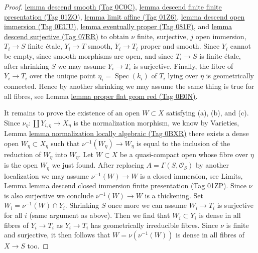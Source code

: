 \documentclass{amsart}
\theoremstyle{plain}
\theoremstyle{definition}
\theoremstyle{remark}
\numberwithin{equation}{subsection}
\def\Spec{\mathop{\mathrm{Spec}}}
\begin{document}
\begin{proof}
\href{https://stacks.math.columbia.edu/tag/0C0C}{lemma descend smooth (Tag 0C0C)},
\href{https://stacks.math.columbia.edu/tag/01ZO}{lemma descend finite finite presentation (Tag 01ZO)},
\href{https://stacks.math.columbia.edu/tag/01Z6}{lemma limit affine (Tag 01Z6)},
\href{https://stacks.math.columbia.edu/tag/0EUU}{lemma descend open immersion (Tag 0EUU)},
\href{https://stacks.math.columbia.edu/tag/081F}{lemma eventually proper (Tag 081F)}, and
\href{https://stacks.math.columbia.edu/tag/07RR}{lemma descend surjective (Tag 07RR)}
to obtain $\nu$ finite, surjective, $j$ open immersion, $T_i \to S$ finite
\'etale, $Y_i \to T$ smooth, $\overline{Y}_i \to T_i$ proper and
smooth. Since $Y_i$ cannot be empty, since smooth morphisms
are open, and since $T_i \to S$ is finite \'etale, after shrinking $S$
we may assume $Y_i \to T_i$ is surjective. Finally, the fibre of
$\overline{Y}_i \to T_i$ over the unique point $\eta_i = \Spec(k_i)$ 
of $T_i$ lying over $\eta$ is geometrically connected.
Hence by another shrinking we may assume the same thing is
true for all fibres, see
Lemma \href{https://stacks.math.columbia.edu/tag/0E0N}{lemma proper flat geom red (Tag 0E0N)}.

\medskip\noindent
It remains to prove the existence of an open $W \subset X$
satisfying (a), (b), and (c). Since $\nu_\eta : \coprod Y_{i, \eta} \to X_\eta$
is the normalization morphism, we know by
Varieties, Lemma \href{https://stacks.math.columbia.edu/tag/0BXR}{lemma normalization locally algebraic (Tag 0BXR)}
there exists a dense open $W_\eta \subset X_\eta$
such that $\nu^{-1}(W_\eta) \to W_\eta$ is equal to
the inclusion of the reduction of $W_\eta$ into $W_\eta$.
Let $W \subset X$ be a quasi-compact open whose fibre
over $\eta$ is the open $W_\eta$ we just found.
After replacing $A = \Gamma(S, \mathcal{O}_S)$
by another localization we may assume $\nu^{-1}(W) \to W$
is a closed immersion, see Limits, Lemma
\href{https://stacks.math.columbia.edu/tag/01ZP}{lemma descend closed immersion finite presentation (Tag 01ZP)}.
Since $\nu$ is also surjective we conclude
$\nu^{-1}(W) \to W$ is a thickening.
Set $W_i = \nu^{-1}(W) \cap Y_i$.
Shrinking $S$ once more we can assume $W_i \to T_i$ is
surjective for all $i$ (same argument as above).
Then we find that $W_i \subset Y_i$
is dense in all fibres of $Y_i \to T_i$ as $Y_i \to T_i$ has
geometrically irreducible fibres.
Since $\nu$ is finite and surjective, it then follows
that $W = \nu(\nu^{-1}(W))$ is dense in all fibres
of $X \to S$ too.
\end{proof}
\end{document}
